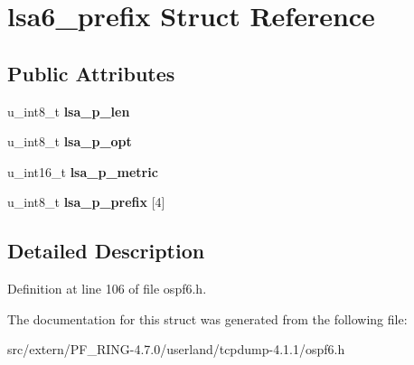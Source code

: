 \hypertarget{structlsa6__prefix}{
\section{lsa6\_\-prefix Struct Reference}
\label{structlsa6__prefix}
}
\subsection*{Public Attributes}
\begin{DoxyCompactItemize}
\item 
\hypertarget{structlsa6__prefix_a7c203a569e860586b7ad7d0eb4f5bfae}{
u\_\-int8\_\-t {\bfseries lsa\_\-p\_\-len}}
\label{structlsa6__prefix_a7c203a569e860586b7ad7d0eb4f5bfae}

\item 
\hypertarget{structlsa6__prefix_ad0e79ff996587d74d17cffd637ca3618}{
u\_\-int8\_\-t {\bfseries lsa\_\-p\_\-opt}}
\label{structlsa6__prefix_ad0e79ff996587d74d17cffd637ca3618}

\item 
\hypertarget{structlsa6__prefix_a4afb4be227de3d4c2244345dc331d96c}{
u\_\-int16\_\-t {\bfseries lsa\_\-p\_\-metric}}
\label{structlsa6__prefix_a4afb4be227de3d4c2244345dc331d96c}

\item 
\hypertarget{structlsa6__prefix_a3a44c0cb660a7e9ae035e6dc5bdb55df}{
u\_\-int8\_\-t {\bfseries lsa\_\-p\_\-prefix} \mbox{[}4\mbox{]}}
\label{structlsa6__prefix_a3a44c0cb660a7e9ae035e6dc5bdb55df}

\end{DoxyCompactItemize}


\subsection{Detailed Description}


Definition at line 106 of file ospf6.h.



The documentation for this struct was generated from the following file:\begin{DoxyCompactItemize}
\item 
src/extern/PF\_\-RING-\/4.7.0/userland/tcpdump-\/4.1.1/ospf6.h\end{DoxyCompactItemize}
